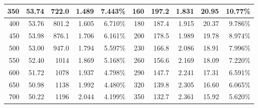 \documentclass{article}
\begin{document}
\begin{table}[p]
\begin{tabular}{|r|r|r|r|r|r|r|r|r|r|}
        \hline
        350                           & 53.74                                & 722.0                     & 1.489                     & 7.443\%                   & 160                     & 197.2                     & 1.831                     & 20.95                    & 10.77\% \bigstrut                  \\
        \hline
        400                           & 53.76                                & 801.2                     & 1.605                     & 6.710\%                   & 180                     & 187.4                     & 1.915                     & 20.37                    & 9.786\% \bigstrut                   \\
        \hline
        450                           & 53.98                                & 876.1                     & 1.706                     & 6.161\%                   & 200                     & 178.5                     & 1.989                     & 19.78                    & 8.974\% \bigstrut                   \\
        \hline
        500                           & 53.00                                & 947.0                     & 1.794                     & 5.597\%                   & 230                     & 166.8                     & 2.086                     & 18.91                    & 7.996\% \bigstrut                   \\
        \hline
        550                           & 52.40                                & 1014                      & 1.869                     & 5.168\%                   & 260                     & 156.6                     & 2.169                     & 18.09                    & 7.220\% \bigstrut                   \\
        \hline
        600                           & 51.72                                & 1078                      & 1.937                     & 4.798\%                   & 290                     & 147.7                     & 2.241                     & 17.31                    & 6.591\% \bigstrut                   \\
        \hline
        650                           & 50.98                                & 1138                      & 1.992                     & 4.480\%                   & 320                     & 139.8                     & 2.305                     & 16.60                    & 6.065\% \bigstrut                   \\
        \hline
        700                           & 50.22                                & 1196                      & 2.044                     & 4.199\%                   & 350                     & 132.7                     & 2.361                     & 15.92                    & 5.620\% \bigstrut                   \\

\end{tabular}
\end{table}
\end{document}
